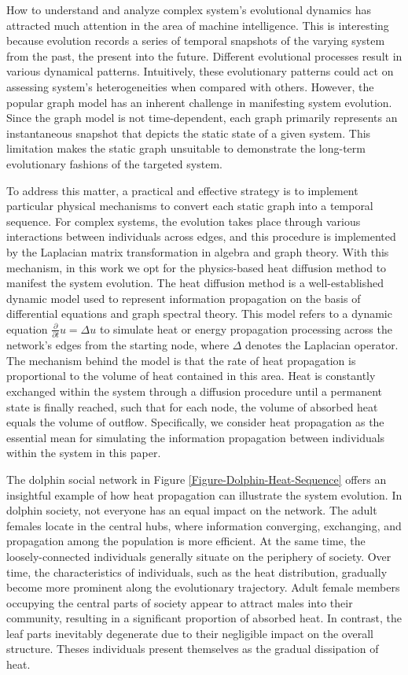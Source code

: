 \documentclass[10pt,journal,compsoc]{IEEEtran}
\begin{document}
How to understand and analyze complex system's evolutional dynamics has attracted much attention in the area of machine intelligence. This is interesting because evolution records a series of temporal snapshots of the varying system from the past, the present into the future. Different evolutional processes result in various dynamical patterns. Intuitively, these evolutionary patterns could act on assessing system's heterogeneities when compared with others. However, the popular graph model has an inherent challenge in manifesting system evolution. Since the graph model is not time-dependent, each graph primarily represents an instantaneous snapshot that depicts the static state of a given system. This limitation makes the static graph unsuitable to demonstrate the long-term evolutionary fashions of the targeted system.


To address this matter, a practical and effective strategy is to implement particular physical mechanisms to convert each static graph into a temporal sequence. For complex systems, the evolution takes place through various interactions between individuals across edges, and this procedure is implemented by the Laplacian matrix transformation in algebra and graph theory. With this mechanism, in this work we opt for the physics-based heat diffusion method to manifest the system evolution. The heat diffusion method is a well-established dynamic model used to represent information propagation on the basis of differential equations and graph spectral theory. This model refers to a dynamic equation $\frac{\partial}{\partial t} u = \Delta u$ to simulate heat or energy propagation processing across the network's edges from the starting node, where $\Delta$ denotes the Laplacian operator. The mechanism behind the model is that the rate of heat propagation is proportional to the volume of heat contained in this area. Heat is constantly exchanged within the system through a diffusion procedure until a permanent state is finally reached, such that for each node, the volume of absorbed heat equals the volume of outflow. Specifically, we consider heat propagation as the essential mean for simulating the information propagation between individuals within the system in this paper.


The dolphin social network in Figure \ref{Figure-Dolphin-Heat-Sequence} offers an insightful example of how heat propagation can illustrate the system evolution. In dolphin society, not everyone has an equal impact on the network. The adult females locate in the central hubs, where information converging, exchanging, and propagation among the population is more efficient. At the same time, the loosely-connected individuals generally situate on the periphery of society. Over time, the characteristics of individuals, such as the heat distribution, gradually become more prominent along the evolutionary trajectory. Adult female members occupying the central parts of society appear to attract males into their community, resulting in a significant proportion of absorbed heat. In contrast, the leaf parts inevitably degenerate due to their negligible impact on the overall structure. Theses individuals present themselves as the gradual dissipation of heat.
\end{document}
